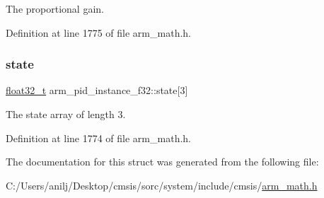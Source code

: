 The proportional gain. 

Definition at line 1775 of file arm\+\_\+math.\+h.

\mbox{\label{structarm__pid__instance__f32_afd394e1e52fb1d526aa472c83b8f2464}} 
\subsubsection{\texorpdfstring{state}{state}}
{\footnotesize\ttfamily \hyperlink{arm__math_8h_a4611b605e45ab401f02cab15c5e38715}{float32\+\_\+t} arm\+\_\+pid\+\_\+instance\+\_\+f32\+::state\mbox{[}3\mbox{]}}

The state array of length 3. 

Definition at line 1774 of file arm\+\_\+math.\+h.



The documentation for this struct was generated from the following file\+:\begin{DoxyCompactItemize}
\item 
C\+:/\+Users/anilj/\+Desktop/cmsis/sorc/system/include/cmsis/\hyperlink{arm__math_8h}{arm\+\_\+math.\+h}\end{DoxyCompactItemize}
